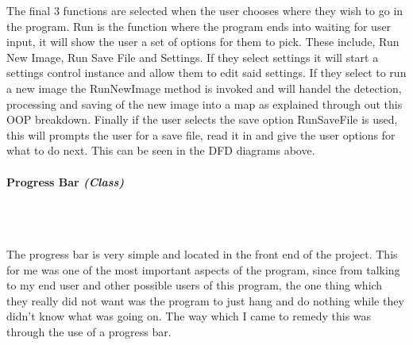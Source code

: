 \begin{FlushLeft}
    The final 3 functions are selected when the user chooses where they wish to go in the program. Run is the function where the program ends into waiting for user input, it will show the user a set of options for them to pick. These include, Run New Image, Run Save File and Settings. If they select settings it will start a settings control instance and allow them to edit said settings. If they select to run a new image the RunNewImage method is invoked and will handel the detection, processing and saving of the new image into a map as explained through out this OOP breakdown. Finally if the user selects the save option RunSaveFile is used, this will prompts the user for a save file, read it in and give the user options for what to do next. This can be seen in the DFD diagrams above.
    \bk

    \pagebreak
\paragraph{Progress Bar \textit{(Class)}} \mbox{} \\

    \begin{figure}[H]
        \centering
    \end{figure}\\

    The progress bar is very simple and located in the front end of the project. This for me was one of the most important aspects of the program, since from talking to my end user and other possible users of this program, the one thing which they really did not want was the program to just hang and do nothing while they didn't know what was going on. The way which I came to remedy this was through the use of a progress bar. \\ \bk


\end{FlushLeft}
